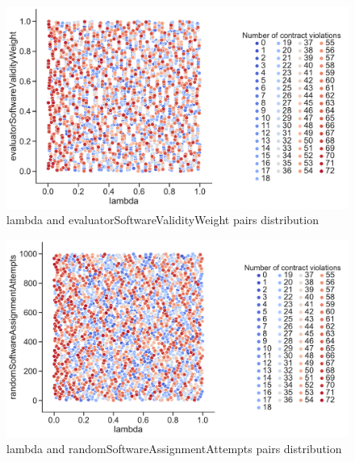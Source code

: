 \begin{figure}
	\centering
	\includegraphics[width=\textwidth]{images/PairsDistr/lambda_evaluatorSoftwareValidityWeight.pdf}
	\caption[lambda and evaluatorSoftwareValidityWeight pairs distribution]{lambda and evaluatorSoftwareValidityWeight pairs distribution}
	\label{fig:lambda_evaluatorSoftwareValidityWeight_pair}
\end{figure}
\begin{figure}
	\centering
	\includegraphics[width=\textwidth]{images/PairsDistr/lambda_randomSoftwareAssignmentAttempts.pdf}
	\caption[lambda and randomSoftwareAssignmentAttempts pairs distribution]{lambda and randomSoftwareAssignmentAttempts pairs distribution}
	\label{fig:lambda_randomSoftwareAssignmentAttempts_pair}
\end{figure}
